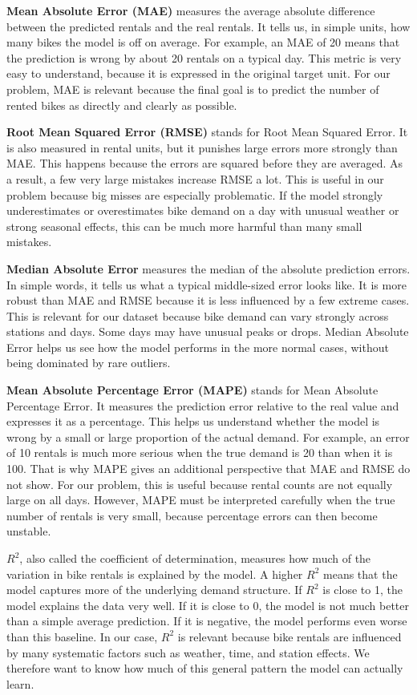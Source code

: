 \documentclass[conference]{IEEEtran}
\begin{document}
\textbf{Mean Absolute Error (MAE)} measures the average absolute difference between the predicted rentals 
and the real rentals. It tells us, in simple units, how many bikes the model is off on average. For example, 
an MAE of 20 means that the prediction is wrong by about 20 rentals on a typical day. This metric is very 
easy to understand, because it is expressed in the original target unit. For our problem, MAE is relevant 
because the final goal is to predict the number of rented bikes as directly and clearly as possible.

\textbf{Root Mean Squared Error (RMSE)} stands for Root Mean Squared Error. It is also measured in rental units, 
but it punishes large errors more strongly than MAE. This happens because the errors are squared before they are 
averaged. As a result, a few very large mistakes increase RMSE a lot. This is useful in our problem because 
big misses are especially problematic. If the model strongly underestimates or overestimates bike demand on a day 
with unusual weather or strong seasonal effects, this can be much more harmful than many small mistakes.

\textbf{Median Absolute Error} measures the median of the absolute prediction errors. In simple words, it tells us 
what a typical middle-sized error looks like. It is more robust than MAE and RMSE because it is less influenced by 
a few extreme cases. This is relevant for our dataset because bike demand can vary strongly across stations and days. 
Some days may have unusual peaks or drops. Median Absolute Error helps us see how the model performs in the more normal 
cases, without being dominated by rare outliers.

\textbf{Mean Absolute Percentage Error (MAPE)} stands for Mean Absolute Percentage Error. It measures the prediction 
error relative to the real value and expresses it as a percentage. This helps us understand whether the model is wrong 
by a small or large proportion of the actual demand. For example, an error of 10 rentals is much more serious when the 
true demand is 20 than when it is 100. That is why MAPE gives an additional perspective that MAE and RMSE do not show. 
For our problem, this is useful because rental counts are not equally large on all days. However, MAPE must be interpreted 
carefully when the true number of rentals is very small, because percentage errors can then become unstable.

\textbf{$R^2$}, also called the coefficient of determination, measures how much of the variation in bike rentals is explained 
by the model. A higher $R^2$ means that the model captures more of the underlying demand structure. If $R^2$ is close to 1, 
the model explains the data very well. If it is close to 0, the model is not much better than a simple average prediction. 
If it is negative, the model performs even worse than this baseline. In our case, $R^2$ is relevant because bike rentals are 
influenced by many systematic factors such as weather, time, and station effects. We therefore want to know how much of this 
general pattern the model can actually learn.
\end{document}

